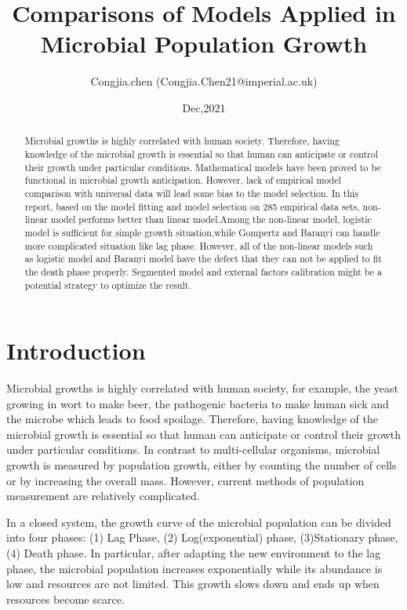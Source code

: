 \documentclass[11pt]{article}
\title{Comparisons of Models Applied in Microbial Population Growth}
\author{Congjia.chen (Congjia.Chen21@imperial.ac.uk)}
\date{Dec,2021}
\begin{document}
  \maketitle
  \newpage
 
  \begin{abstract}
     \linenumbers
    Microbial growths is highly correlated with human society. Therefore, having knowledge of the microbial growth is essential so that human can anticipate or control their growth under particular conditions. Mathematical models have been proved to be functional in microbial growth anticipation. However, lack of empirical model comparison with universal data will lead some bias to the model selection. In this report, based on the model fitting and model selection on 285 empirical data sets,  non-linear model performs better than linear model.Among the non-linear model, logistic model is sufficient for simple growth situation,while Gompertz and Baranyi can handle more complicated situation like lag phase. However, all of the non-linear models such as logistic model and Baranyi model have the defect that they can not be applied to fit the death phase properly. Segmented model and external factors calibration might be a potential strategy to optimize the result.
  \end{abstract}
  
  \section{Introduction}
  \linenumbers
  Microbial growths is highly correlated with human society, for example, the yeast growing in wort to make beer, the pathogenic bacteria to make human sick and the microbe which leads to food spoilage. Therefore, having knowledge of the microbial growth is essential so that human can anticipate or control their growth under particular conditions\cite{shoemaker_microbial_2021}. In contrast to multi-cellular organisms, microbial growth is measured by population growth, either by counting the number of cells or by increasing the overall mass. However, current methods of population measurement are relatively complicated\cite{egli_microbial_2015}.
   
  In a closed system, the growth curve of the microbial population can be divided into four phases: (1) Lag Phase, (2) Log(exponential) phase, (3)Stationary phase, (4) Death phase\cite{peleg_microbial_2011}. In particular, after adapting the new environment to the lag phase, the microbial population increases exponentially while its abundance is low and resources are not limited. This growth slows down and ends up when resources become scarce.
 
\end{document}
